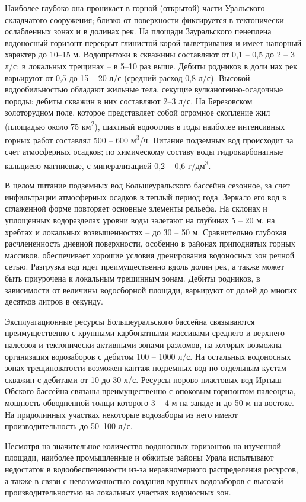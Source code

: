 Наиболее глубоко она проникает в горной (открытой) части Уральского складчатого сооружения; близко от поверхности фиксируется в тектонически ослабленных зонах и в долинах рек. На площади Зауральского пенеплена водоносный горизонт перекрыт глинистой корой выветривания и имеет напорный характер до 10–15 м. Водопритоки в скважины составляют от 0,1 – 0,5 до 2 – 3 л/с; в локальных трещинах – в 5–10 раз выше. Дебиты родников в доли нах рек варьируют от 0,5 до 15 – 20 л/с (средний расход 0,8 л/с).
Высокой водообильностью обладают жильные тела, секущие вулканогенно-осадочные породы: дебиты скважин в них составляют 2–3 л/с. На Березовском золоторудном поле, которое представляет собой огромное скопление жил (площадью около 75 км\textsuperscript{2}), шахтный водоотлив в годы наиболее интенсивных горных работ составлял 500 – 600 м\textsuperscript{3}/ч. Питание подземных вод происходит за счет атмосферных осадков; по химическому составу воды гидрокарбонатные кальциево-магниевые, с минерализацией 0,2 – 0,6 г/дм\textsuperscript{3}.

В целом питание подземных вод Большеуральского бассейна сезонное, за счет инфильтрации атмосферных осадков в теплый период года. Зеркало его вод в сглаженной форме повторяет основные элементы рельефа. На склонах и уплощенных водоразделах уровни воды залегают на глубинах 5 – 20 м, на хребтах и локальных возвышенностях – до 30 – 50 м. Сравнительно глубокая расчлененность дневной поверхности, особенно в районах приподнятых горных массивов, обеспечивает хорошие условия дренирования водоносных зон речной сетью. Разгрузка вод идет преимущественно вдоль долин рек, а также может быть приурочена к локальным трещинным зонам. Дебиты родников, в зависимости от величины водосборной площади, варьируют от долей до многих десятков литров в секунду.

Эксплуатационные ресурсы Большеуральского бассейна связываются преимущественно с крупными карбонатными массивами среднего и верхнего палеозоя и тектонически активными зонами разломов, на которых возможна организация водозаборов с дебитом 100 – 1000 л/с. На остальных водоносных зонах трещиноватости возможен каптаж подземных вод по отдельным кустам скважин с дебитами от 10 до 30 л/с. Ресурсы порово-пластовых вод Иртыш-Обского бассейна связаны преимущественно с опоковым горизонтом палеоцена, мощность обводненной толщи которого 3 – 4 м на западе и до 50 м на востоке. На придолинных участках некоторые водозаборы из него имеют производительность до 50–100 л/с.

Несмотря на значительное количество водоносных горизонтов на изученной площади, наиболее промышленные и обжитые районы Урала испытывают недостаток в водообеспеченности из-за неравномерного распределения ресурсов, а также в связи с невозможностью создания крупных водозаборов с высокой производительностью на локальных участках водоносных зон.
